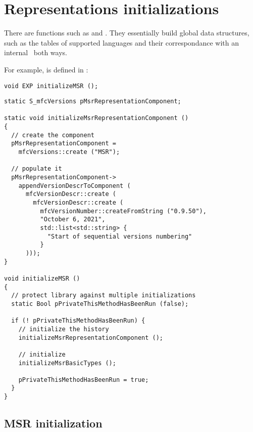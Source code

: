 \section{Representations initializations}

There are  functions such as  and . They essentially build global data structures, such as the tables of supported languages and their correspondance with an internal \enumType\ both ways.

For example,  is defined in :
\begin{lstlisting}[language=CPlusPlus]
void EXP initializeMSR ();
\end{lstlisting}

\begin{lstlisting}[language=CPlusPlus]
static S_mfcVersions pMsrRepresentationComponent;

static void initializeMsrRepresentationComponent ()
{
  // create the component
  pMsrRepresentationComponent =
    mfcVersions::create ("MSR");

  // populate it
  pMsrRepresentationComponent->
    appendVersionDescrToComponent (
      mfcVersionDescr::create (
        mfcVersionDescr::create (
          mfcVersionNumber::createFromString ("0.9.50"),
          "October 6, 2021",
          std::list<std::string> {
            "Start of sequential versions numbering"
          }
      )));
}

void initializeMSR ()
{
  // protect library against multiple initializations
  static Bool pPrivateThisMethodHasBeenRun (false);

  if (! pPrivateThisMethodHasBeenRun) {
    // initialize the history
    initializeMsrRepresentationComponent ();

    // initialize
    initializeMsrBasicTypes ();

    pPrivateThisMethodHasBeenRun = true;
  }
}
\end{lstlisting}


\subsection{MSR initialization}

